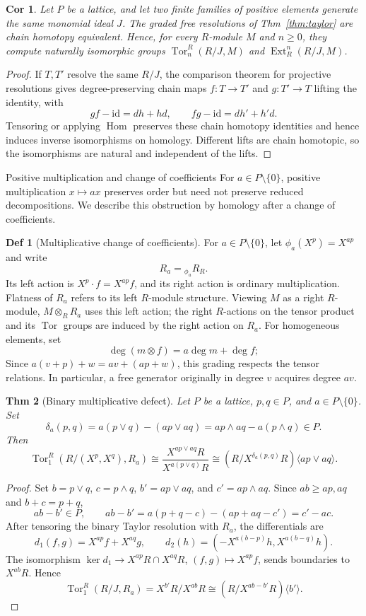 \documentclass[10pt,letterpaper]{amsart}
\makeatletter
\numberwithin{equation}{section}
\newtheorem{thm}{Thm}[section]
\newtheorem{cor}[thm]{Cor}
\theoremstyle{definition}
\newtheorem{defn}{Def}[section]
\newcommand{\Tor}{\operatorname{Tor}}
\newcommand{\Ext}{\operatorname{Ext}}
\newcommand{\Hom}{\operatorname{Hom}}
\newcommand{\id}{\mathrm{id}}
\newcommand{\sh}[1]{\langle #1\rangle}
\def\subsection{\@startsection{subsection}{2}
  \z@{.9\linespacing\@plus.3\linespacing}{.4\linespacing}
  {\normalfont\fontsize{11.5}{14}\selectfont\bfseries\boldmath\raggedright}}
\makeatother
\begin{document}
\begin{cor}\label{cor:independent}
Let $P$ be a lattice, and let two finite families of positive elements generate the same monomial ideal $J$. The graded free resolutions of Thm~\ref{thm:taylor} are chain homotopy equivalent. Hence, for every $R$-module $M$ and $n\ge0$, they compute naturally isomorphic groups $\Tor_n^R(R/J,M)$ and $\Ext_R^n(R/J,M)$.
\end{cor}
\begin{proof}
If $T,T'$ resolve the same $R/J$, the comparison theorem for projective resolutions gives degree-preserving chain maps $f:T\to T'$ and $g:T'\to T$ lifting the identity, with
\[
gf-\id=dh+hd,\qquad fg-\id=dh'+h'd.
\]
Tensoring or applying $\Hom$ preserves these chain homotopy identities and hence induces inverse isomorphisms on homology. Different lifts are chain homotopic, so the isomorphisms are natural and independent of the lifts.
\end{proof}

\subsection{Positive multiplication and change of coefficients}
For $a\in P\setminus\{0\}$, positive multiplication $x\mapsto ax$ preserves order but need not preserve reduced decompositions. We describe this obstruction by homology after a change of coefficients.

\begin{defn}[Multiplicative change of coefficients]\label{def:twist}
For $a\in P\setminus\{0\}$, let $\phi_a(X^p)=X^{ap}$ and write
\[
R_a={}_{\phi_a}R_R.
\]
Its left action is $X^p\cdot f=X^{ap}f$, and its right action is ordinary multiplication. Flatness of $R_a$ refers to its left $R$-module structure. Viewing $M$ as a right $R$-module, $M\otimes_RR_a$ uses this left action; the right $R$-actions on the tensor product and its $\Tor$ groups are induced by the right action on $R_a$. For homogeneous elements, set
\[
\deg(m\otimes f)=a\deg m+\deg f;
\]
Since $a(v+p)+w=av+(ap+w)$, this grading respects the tensor relations. In particular, a free generator originally in degree $v$ acquires degree $av$.
\end{defn}

\begin{thm}[Binary multiplicative defect]\label{thm:defect}
Let $P$ be a lattice, $p,q\in P$, and $a\in P\setminus\{0\}$. Set
\[
\delta_a(p,q)=a(p\vee q)-(ap\vee aq)
=ap\wedge aq-a(p\wedge q)\in P.
\]
Then
\[
\Tor_1^R(R/(X^p,X^q),R_a)
\cong\frac{X^{ap\vee aq}R}{X^{a(p\vee q)}R}
\cong(R/X^{\delta_a(p,q)}R)\sh{ap\vee aq}.
\]
\end{thm}
\begin{proof}
Set $b=p\vee q$, $c=p\wedge q$, $b'=ap\vee aq$, and $c'=ap\wedge aq$. Since $ab\ge ap,aq$ and $b+c=p+q$,
\[
ab-b'\in P,\qquad ab-b'=a(p+q-c)-(ap+aq-c')=c'-ac.
\]
After tensoring the binary Taylor resolution with $R_a$, the differentials are
\[
d_1(f,g)=X^{ap}f+X^{aq}g,\qquad
d_2(h)=(-X^{a(b-p)}h,X^{a(b-q)}h).
\]
The isomorphism $\ker d_1\to X^{ap}R\cap X^{aq}R$, $(f,g)\mapsto X^{ap}f$, sends boundaries to $X^{ab}R$. Hence
\[
\Tor_1^R(R/J,R_a)=X^{b'}R/X^{ab}R
\cong(R/X^{ab-b'}R)\sh{b'}.
\]
\end{proof}
\end{document}
